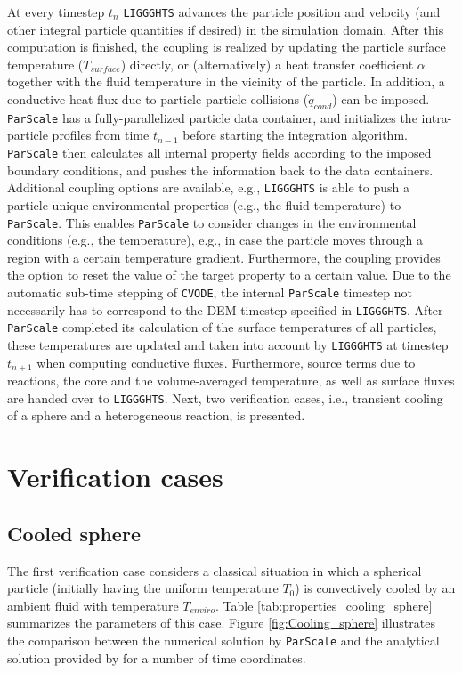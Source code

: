 \documentclass{particles2015}
\begin{document}
At every timestep $t_n$ \texttt{LIGGGHTS}\textsuperscript{\textregistered} advances the particle position and velocity (and other integral particle quantities if desired) in the simulation domain. After this computation is finished, the coupling is realized by updating the particle surface temperature ($T_{surface}$) directly, or (alternatively) a heat transfer coefficient $\alpha$ together with the fluid temperature in the vicinity of the particle. In addition, a conductive heat flux due to particle-particle collisions  ($\dot{q}_{cond}$) can be imposed. \texttt{ParScale} has a fully-parallelized particle data container, and initializes the intra-particle profiles from time $t_{n-1}$ before starting the integration algorithm. \texttt{ParScale} then calculates all internal property fields according to the imposed boundary conditions, and pushes the information back to the data containers. Additional coupling options are available, e.g., \texttt{LIGGGHTS}\textsuperscript{\textregistered} is able to push a particle-unique environmental properties (e.g., the fluid temperature) to \texttt{ParScale}. This enables \texttt{ParScale} to consider changes in the environmental conditions (e.g., the temperature), e.g., in case the particle moves through a region with a certain temperature gradient. Furthermore, the coupling provides the option to reset the value of the target property to a certain value. Due to the automatic sub-time stepping of \texttt{CVODE}, the internal \texttt{ParScale} timestep not necessarily has to correspond to the DEM timestep specified in \texttt{LIGGGHTS}\textsuperscript{\textregistered}. After \texttt{ParScale} completed its calculation of the surface temperatures of all particles, these temperatures are updated and taken into account by \texttt{LIGGGHTS}\textsuperscript{\textregistered} at timestep $t_{n+1}$ when computing conductive fluxes. Furthermore, source terms due to reactions, the core and the volume-averaged temperature, as well as surface fluxes are handed over to \texttt{LIGGGHTS}\textsuperscript{\textregistered}. Next, two verification cases, i.e., transient cooling of a sphere and a heterogeneous reaction, is presented.

\section{Verification cases}
\label{sec:verification_case}

\subsection{Cooled sphere}
\label{sec:transient_cooling}
The first verification case considers a classical situation in which a spherical particle (initially having the uniform temperature $T_0$) is convectively cooled by an ambient fluid with temperature $T_{enviro}$. Table \ref{tab:properties_cooling_sphere} summarizes the parameters of this case. Figure \ref{fig:Cooling_sphere} illustrates the comparison between the numerical solution by \texttt{ParScale} and the analytical solution provided by \cite{Crank1975} for a number of time coordinates. 
\end{document}
